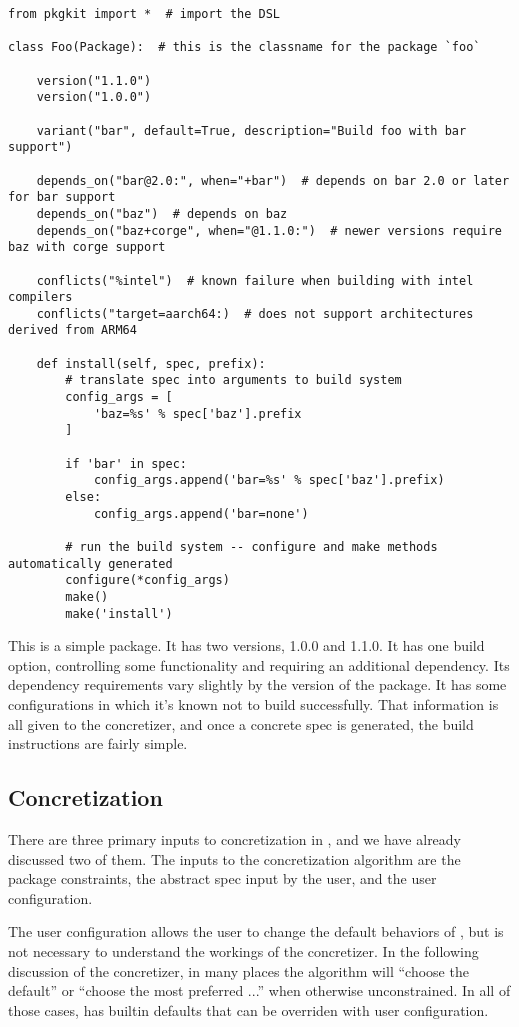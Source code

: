 \begin{verbatim}
from pkgkit import *  # import the DSL

class Foo(Package):  # this is the classname for the package `foo`

    version("1.1.0")
    version("1.0.0")

    variant("bar", default=True, description="Build foo with bar support")

    depends_on("bar@2.0:", when="+bar")  # depends on bar 2.0 or later for bar support
    depends_on("baz")  # depends on baz
    depends_on("baz+corge", when="@1.1.0:")  # newer versions require baz with corge support

    conflicts("%intel")  # known failure when building with intel compilers
    conflicts("target=aarch64:)  # does not support architectures derived from ARM64

    def install(self, spec, prefix):
        # translate spec into arguments to build system
        config_args = [
            'baz=%s' % spec['baz'].prefix
        ]

        if 'bar' in spec:
            config_args.append('bar=%s' % spec['baz'].prefix)
        else:
            config_args.append('bar=none')

        # run the build system -- configure and make methods automatically generated
        configure(*config_args)
        make()
        make('install')
\end{verbatim}

This is a simple package.
It has two versions, 1.0.0 and 1.1.0.
It has one build option, controlling some functionality and requiring an additional dependency.
Its dependency requirements vary slightly by the version of the package.
It has some configurations in which it's known not to build successfully.
That information is all given to the concretizer, and once a concrete spec is generated, the build instructions are fairly simple.

\subsection{Concretization}

There are three primary inputs to concretization in \spack, and we have already discussed two of them.
The inputs to the concretization algorithm are the package constraints, the abstract spec input by the user, and the user configuration.

The user configuration allows the user to change the default behaviors of \spack, but is not necessary to understand the workings of the concretizer.
In the following discussion of the concretizer, in many places the algorithm will ``choose the default'' or ``choose the most preferred ...'' when otherwise unconstrained.
In all of those cases, \spack has builtin defaults that can be overriden with user configuration.

